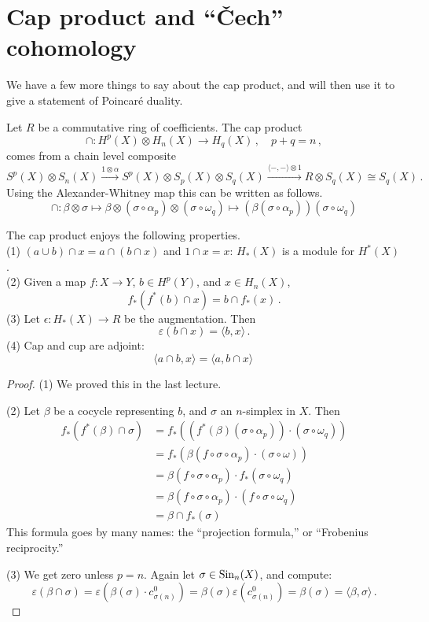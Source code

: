 \section{Cap product and ``\v{C}ech'' cohomology}

We have a few more things to say about the cap product, and will then use it
to give a statement of Poincar\'e duality. 

Let $R$ be a commutative ring of coefficients. The cap product 
\[
\cap: H^p(X)\otimes H_n(X)\to H_{q}(X)\,,\quad p+q=n\,,
\]
comes from a chain level composite 
\[
S^p(X)\otimes S_n(X)\xrightarrow{1\otimes\alpha} S^p(X)\otimes S_p(X)\otimes S_q(X)\xrightarrow{\langle-,-\rangle\otimes 1}R\otimes S_q(X)\cong S_q(X)\,.
\]
Using the Alexander-Whitney map this can be written as follows.
\begin{equation*}
\cap:\beta\otimes\sigma\mapsto\beta\otimes(\sigma\circ\alpha_p)\otimes(\sigma\circ\omega_q)\mapsto\left(\beta(\sigma\circ\alpha_p)\right) (\sigma\circ\omega_q)
\end{equation*}

\begin{prop}
The cap product enjoys the following properties.\\
(1) $(a\cup b)\cap x=a\cap(b\cap x)$ and $1\cap x=x$: $H_*(X)$ is a module for
$H^*(X)$.\\
(2) Given a map $f:X\to Y$, $b\in H^p(Y)$, and $x\in H_n(X)$, 
\[
f_*(f^*(b)\cap x)=b\cap f_*(x)\,.
\]
(3) Let $\epsilon:H_*(X)\to R$ be the augmentation. Then 
\[
\varepsilon(b\cap x)=\langle b,x\rangle\,.
\]
(4) Cap and cup are adjoint:
\[
\langle a\cap b,x\rangle=\langle a,b\cap x\rangle\,
\]
\end{prop}
\begin{proof}
(1) We proved this in the last lecture.

\noindent
(2) Let $\beta$ be a cocycle representing $b$, and $\sigma$ an $n$-simplex
in $X$. Then
\begin{align*}
f_\ast(f^\ast(\beta)\cap\sigma)& =f_\ast(\left(f^\ast(\beta)(\sigma\circ\alpha_p)\right)\cdot(\sigma\circ\omega_q))\\
& =f_\ast(\beta(f\circ\sigma\circ\alpha_p)\cdot(\sigma\circ\omega))\\
& =\beta(f\circ\sigma\circ\alpha_p)\cdot f_\ast(\sigma\circ\omega_q)\\
& = \beta(f\circ\sigma\circ\alpha_p)\cdot(f\circ\sigma\circ\omega_q)\\
& = \beta\cap f_\ast(\sigma)
\end{align*}
This formula goes by many names: the ``projection formula,'' or ``Frobenius
reciprocity.'' 

\noindent
(3) We get zero unless $p=n$. Again let $\sigma\in\mathrm{Sin}_n(X)$, and compute:
\[
\varepsilon(\beta\cap\sigma)=\varepsilon(\beta(\sigma)\cdot c^0_{\sigma(n)})=\beta(\sigma)\varepsilon(c^0_{\sigma(n)})=\beta(\sigma)=\langle \beta,\sigma\rangle
\,.
\]
\end{proof}


